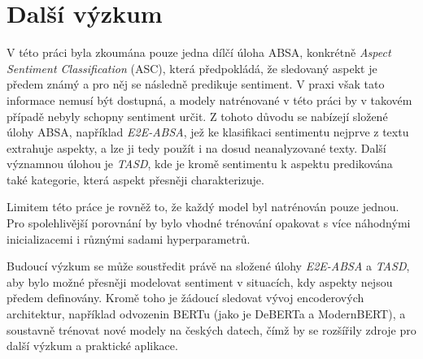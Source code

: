 \section{Další výzkum}
V této práci byla zkoumána pouze jedna dílčí úloha ABSA, konkrétně \emph{Aspect Sentiment Classification} (ASC), která předpokládá, že sledovaný aspekt je předem známý a pro něj se následně predikuje sentiment. V praxi však tato informace nemusí být dostupná, a modely natrénované v této práci by v takovém případě nebyly schopny sentiment určit. Z tohoto důvodu se nabízejí složené úlohy ABSA, například \emph{E2E-ABSA}, jež ke klasifikaci sentimentu nejprve z textu extrahuje aspekty, a lze ji tedy použít i na dosud neanalyzované texty. Další významnou úlohou je \emph{TASD}, kde je kromě sentimentu k aspektu predikována také kategorie, která aspekt přesněji charakterizuje.

Limitem této práce je rovněž to, že každý model byl natrénován pouze jednou. Pro spolehlivější porovnání by bylo vhodné trénování opakovat s více náhodnými inicializacemi i různými sadami hyperparametrů.

Budoucí výzkum se může soustředit právě na složené úlohy \emph{E2E-ABSA} a \emph{TASD}, aby bylo možné přesněji modelovat sentiment v situacích, kdy aspekty nejsou předem definovány. Kromě toho je žádoucí sledovat vývoj encoderových architektur, například odvozenin BERTu (jako je DeBERTa a ModernBERT), a soustavně trénovat nové modely na českých datech, čímž by se rozšířily zdroje pro další výzkum a praktické aplikace.
